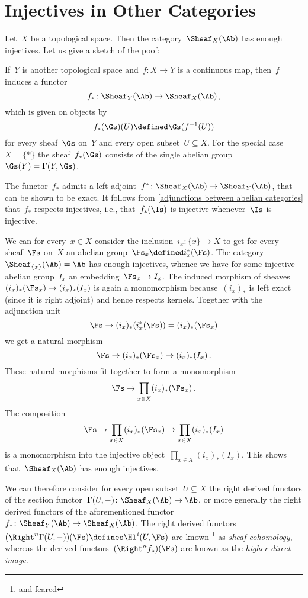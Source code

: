 \section{Injectives in Other Categories}


\begin{example}
  Let~$X$ be a topological space.
  Then the category~$\Sheaf_X(\Ab)$ has enough injectives.
  Let us give a sketch of the poof:
  
  If~$Y$ is another topological space and~$f \colon X \to Y$ is a continuous map, then~$f$ induces a functor
  \[
    f_*
    \colon
    \Sheaf_Y(\Ab)
    \to
    \Sheaf_X(\Ab)  \,,
  \]
  which is given on objects by
  \[
    f_*(\Gs)(U)
    \defined
    \Gs(f^{-1}(U))
  \]
  for every sheaf~$\Gs$ on~$Y$ and every open subset~$U \subseteq X$.
  For the special case~$X = \{\ast\}$ the sheaf~$f_*(\Gs)$ consists of the single abelian group~$\Gs(Y) = \Gamma(Y,\Gs)$.
  
  The functor~$f_*$ admits a left adjoint~$f^* \colon \Sheaf_X(\Ab) \to \Sheaf_Y(\Ab)$, that can be shown to be exact.
  It follows from \cref{adjunctions between abelian categories} that~$f_*$ respects injectives, i.e., that~$f_*(\Is)$ is injective whenever~$\Is$ is injective.
  
  We can for every~$x \in X$ consider the inclusion~$i_x \colon \{x\} \to X$ to get for every sheaf~$\Fs$ on~$X$ an abelian group~$\Fs_x \defined i_x^*(\Fs)$.
  The category~$\Sheaf_{\{x\}}(\Ab) = \Ab$ has enough injectives, whence we have for some injective abelian group~$I_x$ an embedding~$\Fs_x \to I_x$.
  The induced morphism of sheaves~$(i_x)_*(\Fs_x) \to (i_x)_*(I_x)$ is again a monomorphism because~$(i_x)_*$ is left exact (since it is right adjoint) and hence respects kernels.
  Together with the adjunction unit
  \[
    \Fs
    \to
    (i_x)_*( i_x^*(\Fs) )
    =
    (i_x)_*( \Fs_x )
  \]
  we get a natural morphism
  \[
    \Fs
    \to
    (i_x)_*( \Fs_x )
    \to
    (i_x)_*(I_x)  \,.
  \]
  These natural morphisms fit together to form a monomorphism
  \[
    \Fs
    \to
    \prod_{x \in X} (i_x)_*(\Fs_x)  \,.
  \]
  The composition
  \[
    \Fs
    \to
    \prod_{x \in X} (i_x)_*(\Fs_x)
    \to
    \prod_{x \in X} (i_x)_*(I_x)
  \]
  is a monomorphism into the injective object~$\prod_{x \in X} (i_x)_*(I_x)$.
  This shows that~$\Sheaf_X(\Ab)$ has enough injectives.
  
  We can therefore consider for every open subset~$U \subseteq X$ the right derived functors of the section functor~$\Gamma(U, -) \colon \Sheaf_X(\Ab) \to \Ab$, or more generally the right derived functors of the aforementioned functor~$f_* \colon \Sheaf_Y(\Ab) \to \Sheaf_X(\Ab)$.
  The right derived functors~$(\Right^n \Gamma(U,-))(\Fs) \defines \Hl^i(U,\Fs)$ are known%
  \footnote{and feared}
  as \emph{sheaf cohomology}, whereas the derived functors~$(\Right^n f_*)(\Fs)$ are known as the \emph{higher direct image}.
\end{example}




